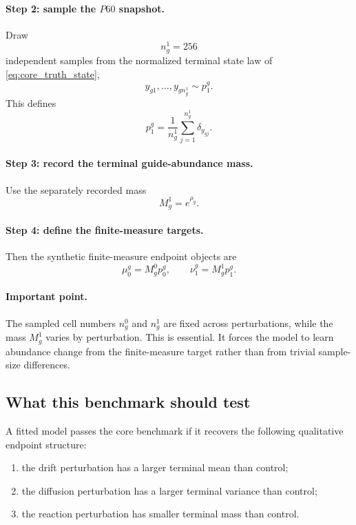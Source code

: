 \documentclass[11pt]{article}
\begin{document}
\paragraph{Step 2: sample the $P60$ snapshot.}
Draw
\[
n_g^1 = 256
\]
independent samples from the normalized terminal state law of \cref{eq:core_truth_state},
\[
y_{g1},\dots,y_{g n_g^1}\sim p_1^g.
\]
This defines
\begin{equation}
p_1^g
=
\frac{1}{n_g^1}\sum_{j=1}^{n_g^1}\delta_{y_{gj}}.
\label{eq:empirical_p1_core}
\end{equation}

\paragraph{Step 3: record the terminal guide-abundance mass.}
Use the separately recorded mass
\begin{equation}
M_g^1 = e^{\rho_g}.
\label{eq:observed_mass_core}
\end{equation}

\paragraph{Step 4: define the finite-measure targets.}
Then the synthetic finite-measure endpoint objects are
\begin{equation}
\mu_0^g = M_g^0 p_0^g,
\qquad
\nu_1^g = M_g^1 p_1^g.
\label{eq:finite_measure_core}
\end{equation}

\paragraph{Important point.}
The sampled cell numbers \(n_g^0\) and \(n_g^1\) are fixed across perturbations, while the mass \(M_g^1\) varies by perturbation. This is essential. It forces the model to learn abundance change from the finite-measure target rather than from trivial sample-size differences.

\subsection{What this benchmark should test}

A fitted model passes the core benchmark if it recovers the following qualitative endpoint structure:
\begin{enumerate}[label=(\roman*),leftmargin=2.2em]
    \item the drift perturbation has a larger terminal mean than control;
    \item the diffusion perturbation has a larger terminal variance than control;
    \item the reaction perturbation has smaller terminal mass than control.
\end{enumerate}
\end{document}
